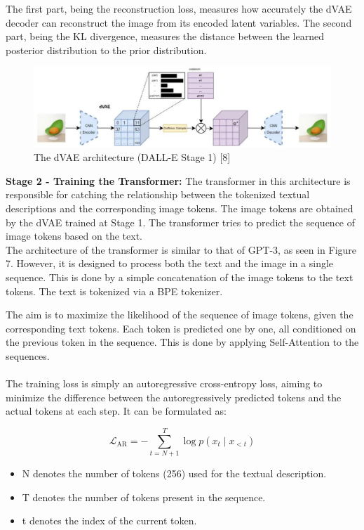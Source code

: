 \documentclass{article}
\begin{document}
The first part, being the reconstruction loss, measures how accurately the dVAE decoder can reconstruct the image from its encoded latent variables. The second part, being the KL divergence, measures the distance between the learned posterior distribution to the prior distribution. \\

\begin{figure}[H]
    \centering
    \includegraphics[width=1\linewidth]{0_yosQ9u0cmtipniHZ.jpeg}
    \caption{The dVAE architecture (DALL-E Stage 1) [8]}
    \label{fig:enter-label}
\end{figure}

\item \textbf{Stage 2 - Training the Transformer:} The transformer in this architecture is responsible for catching the relationship between the tokenized textual descriptions and the corresponding image tokens. The image tokens are obtained by the dVAE trained at Stage 1. The transformer tries to predict the sequence of image tokens based on the text. \\

The architecture of the transformer is similar to that of GPT-3, as seen in Figure 7. However, it is designed to process both the text and the image in a single sequence. This is done by a simple concatenation of the image tokens to the text tokens. The text is tokenized via a BPE tokenizer.

The aim is to maximize the likelihood of the sequence of image tokens, given the corresponding text tokens. Each token is predicted one by one, all conditioned on the previous token in the sequence. This is done by applying Self-Attention to the sequences.  \\ \\

The training loss is simply an autoregressive cross-entropy loss, aiming to minimize the difference between the autoregressively predicted tokens and the actual tokens at each step. It can be formulated as:

\[\mathcal{L}_{\text{AR}} = -\sum_{t=N + 1}^{T} \log p(x_t \mid x_{<t})\]
\begin{itemize}
    \item N denotes the number of tokens (256) used for the textual description.
    \item T denotes the number of tokens present in the sequence.
    \item t denotes the index of the current token.
\end{itemize}
\end{document}
